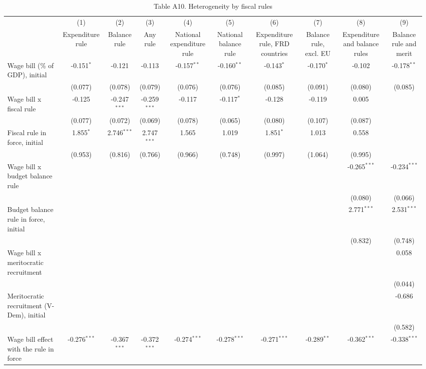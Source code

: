 \begin{table}[htbp]\centering\footnotesize
\providecommand{\sym}[1]{\ensuremath{^{#1}}}
\caption{Table A10. Heterogeneity by fiscal rules}\label{tab:TableA10_fiscal_rules}
\begin{tabular}{l*{9}{c}}
\toprule
 & (1) & (2) & (3) & (4) & (5) & (6) & (7) & (8) & (9) \\
 & Expenditure rule & Balance rule & Any rule & National expenditure rule & National balance rule & Expenditure rule, FRD countries & Balance rule, excl. EU & Expenditure and balance rules & Balance rule and merit \\
\midrule
Wage bill (\% of GDP), initial & -0.151\sym{*} & -0.121 & -0.113 & -0.157\sym{**} & -0.160\sym{**} & -0.143\sym{*} & -0.170\sym{*} & -0.102 & -0.178\sym{**} \\
 & (0.077) & (0.078) & (0.079) & (0.076) & (0.076) & (0.085) & (0.091) & (0.080) & (0.085) \\
Wage bill x fiscal rule & -0.125 & -0.247\sym{***} & -0.259\sym{***} & -0.117 & -0.117\sym{*} & -0.128 & -0.119 & 0.005 &  \\
 & (0.077) & (0.072) & (0.069) & (0.078) & (0.065) & (0.080) & (0.107) & (0.087) &  \\
Fiscal rule in force, initial & 1.855\sym{*} & 2.746\sym{***} & 2.747\sym{***} & 1.565 & 1.019 & 1.851\sym{*} & 1.013 & 0.558 &  \\
 & (0.953) & (0.816) & (0.766) & (0.966) & (0.748) & (0.997) & (1.064) & (0.995) &  \\
Wage bill x budget balance rule &  &  &  &  &  &  &  & -0.265\sym{***} & -0.234\sym{***} \\
 &  &  &  &  &  &  &  & (0.080) & (0.066) \\
Budget balance rule in force, initial &  &  &  &  &  &  &  & 2.771\sym{***} & 2.531\sym{***} \\
 &  &  &  &  &  &  &  & (0.832) & (0.748) \\
Wage bill x meritocratic recruitment &  &  &  &  &  &  &  &  & 0.058 \\
 &  &  &  &  &  &  &  &  & (0.044) \\
Meritocratic recruitment (V-Dem), initial &  &  &  &  &  &  &  &  & -0.686 \\
 &  &  &  &  &  &  &  &  & (0.582) \\
\midrule
Wage bill effect with the rule in force & -0.276\sym{***} & -0.367\sym{***} & -0.372\sym{***} & -0.274\sym{***} & -0.278\sym{***} & -0.271\sym{***} & -0.289\sym{**} & -0.362\sym{***} & -0.338\sym{***} \\

\end{tabular}
\end{table}
